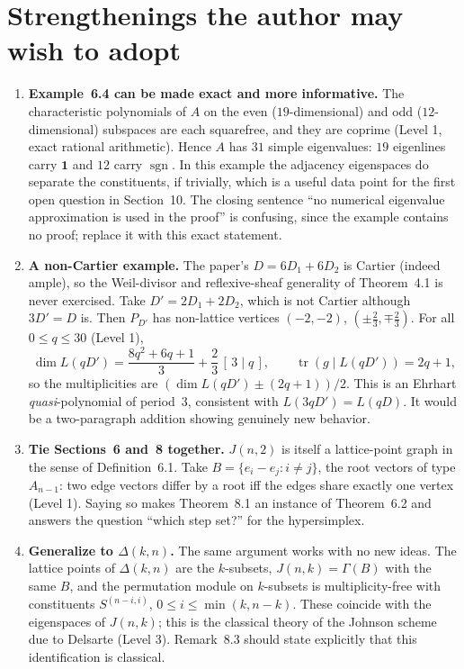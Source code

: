 \documentclass[12pt,letterpaper]{article}
\DeclareMathOperator{\tr}{tr}
\newcommand{\bfone}{\mathbf 1}
\newcommand{\level}[1]{\textsf{Level #1}}
\begin{document}
\section{Strengthenings the author may wish to adopt}\label{sec:strengthen}
\begin{enumerate}[label=\textbf{S\arabic*.}]
\item \textbf{Example~6.4 can be made exact and more informative.}  The characteristic polynomials of $A$ on the even ($19$-dimensional) and odd ($12$-dimensional) subspaces are each squarefree, and they are coprime (\level{1}, exact rational arithmetic).  Hence $A$ has $31$ simple eigenvalues: $19$ eigenlines carry $\bfone$ and $12$ carry $\operatorname{sgn}$.  In this example the adjacency eigenspaces do separate the constituents, if trivially, which is a useful data point for the first open question in Section~10.  The closing sentence ``no numerical eigenvalue approximation is used in the proof'' is confusing, since the example contains no proof; replace it with this exact statement.

\item \textbf{A non-Cartier example.}  The paper's $D=6D_1+6D_2$ is Cartier (indeed ample), so the Weil-divisor and reflexive-sheaf generality of Theorem~4.1 is never exercised.  Take $D'=2D_1+2D_2$, which is not Cartier although $3D'=D$ is.  Then $P_{D'}$ has non-lattice vertices $(-2,-2)$, $(\pm\tfrac23,\mp\tfrac23)$.  For all $0\le q\le30$ (\level{1}),
\[
\dim L(qD')=\frac{8q^2+6q+1}{3}+\frac23\,[\,3\mid q\,],\qquad
\tr(g\mid L(qD'))=2q+1,
\]
so the multiplicities are $(\dim L(qD')\pm(2q+1))/2$.  This is an Ehrhart \emph{quasi}-polynomial of period~$3$, consistent with $L(3qD')=L(qD)$.  It would be a two-paragraph addition showing genuinely new behavior.

\item \textbf{Tie Sections~6 and~8 together.}  $J(n,2)$ is itself a lattice-point graph in the sense of Definition~6.1.  Take $B=\{e_i-e_j:i\ne j\}$, the root vectors of type $A_{n-1}$: two edge vectors differ by a root iff the edges share exactly one vertex (\level{1}).  Saying so makes Theorem~8.1 an instance of Theorem~6.2 and answers the question ``which step set?'' for the hypersimplex.

\item \textbf{Generalize to $\Delta(k,n)$.}  The same argument works with no new ideas.  The lattice points of $\Delta(k,n)$ are the $k$-subsets, $J(n,k)=\Gamma(B)$ with the same $B$, and the permutation module on $k$-subsets is multiplicity-free with constituents $S^{(n-i,i)}$, $0\le i\le\min(k,n-k)$.  These coincide with the eigenspaces of $J(n,k)$; this is the classical theory of the Johnson scheme due to Delsarte (\level{3}).  Remark~8.3 should state explicitly that this identification is classical.
\end{enumerate}
\end{document}

